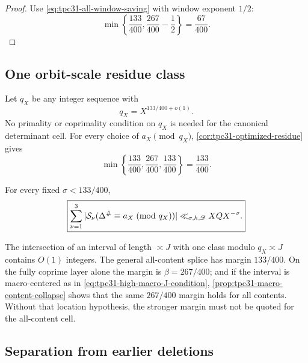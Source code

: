 \begin{proof}
Use \eqref{eq:tpc31-all-window-saving} with window exponent $1/2$:
\[
 \min\left\{\frac{133}{400},
             \frac{267}{400}-\frac12\right\}
 =\frac{67}{400}.
\]
\end{proof}

\subsection{One orbit-scale residue class}

Let $q_X$ be any integer sequence with
\begin{equation}
 q_X=X^{133/400+o(1)}.
 \label{eq:tpc31-high-residue-modulus}
\end{equation}
No primality or coprimality condition on $q_X$ is needed for the
canonical determinant cell.  For every choice of
$a_X\pmod{q_X}$, \cref{cor:tpc31-optimized-residue} gives
\begin{equation}
 \min\left\{\frac{133}{400},
             \frac{267}{400},
             \frac{133}{400}\right\}
 =\boxed{\frac{133}{400}}.
 \label{eq:tpc31-high-residue-margin}
\end{equation}

\begin{corollary}
\label{cor:tpc31-high-residue}
For every fixed $\sigma<133/400$,
\begin{equation}
 \boxed{
 \sum_{\nu=1}^3
 |\mathcal S_\nu(\Delta^\#\equiv a_X\!\pmod{q_X})|
 \ll_{\sigma,h,\mathscr D}XQX^{-\sigma}.}
 \label{eq:tpc31-high-residue-bound}
\end{equation}
\end{corollary}

The intersection of an interval of length $\asymp J$ with one class
modulo $q_X\asymp J$ contains $O(1)$ integers.  The general all-content
splice has margin $133/400$.  On the fully coprime layer alone the
margin is $\beta=267/400$; and if the interval is macro-centered as in
\eqref{eq:tpc31-high-macro-J-condition},
\cref{prop:tpc31-macro-content-collapse} shows that the same
$267/400$ margin holds for all contents.  Without that location
hypothesis, the stronger margin must not be quoted for the all-content
cell.

\subsection{Separation from earlier deletions}


